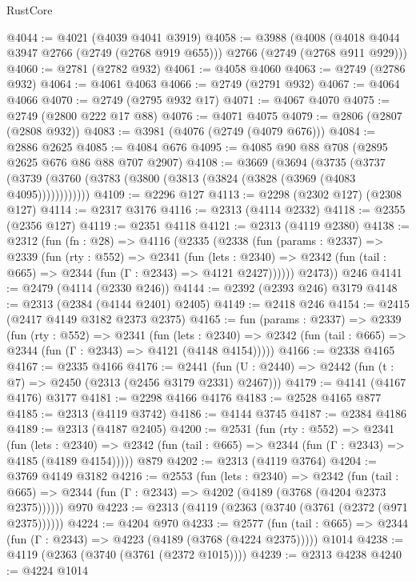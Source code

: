 \begin{lexlean}{RustCore}
\begin{coremodule}
@4044 := @4021 (@4039 @4041 @3919)
@4058 := @3988
    (@4008 (@4018 @4044 @3947 @2766 (@2749 (@2768 @919 @655))) @2766 (@2749 (@2768 @911 @929)))
@4060 := @2781 (@2782 @932)
@4061 := @4058 @4060
@4063 := @2749 (@2786 @932)
@4064 := @4061 @4063
@4066 := @2749 (@2791 @932)
@4067 := @4064 @4066
@4070 := @2749 (@2795 @932 @17)
@4071 := @4067 @4070
@4075 := @2749 (@2800 @222 @17 @88)
@4076 := @4071 @4075
@4079 := @2806 (@2807 (@2808 @932))
@4083 := @3981 (@4076 (@2749 (@4079 @676)))
@4084 := @2886 @2625
@4085 := @4084 @676
@4095 := @4085 @90 @88 @708 (@2895 @2625 @676 @86 @88 @707 @2907)
@4108 := @3669
    (@3694
      (@3735 (@3737 (@3739 (@3760 (@3783 (@3800 (@3813 (@3824 (@3828 (@3969 (@4083 @4095))))))))))))
@4109 := @2296 @127
@4113 := @2298 (@2302 @127) (@2308 @127)
@4114 := @2317 @3176
@4116 := @2313 (@4114 @2332)
@4118 := @2355 (@2356 @127)
@4119 := @2351 @4118
@4121 := @2313 (@4119 @2380)
@4138 := @2312
    (fun (fn : @28) =>
    @4116
      (@2335
        (@2338
          (fun (params : @2337) =>
          @2339
            (fun (rty : @552) =>
            @2341
              (fun (lets : @2340) =>
              @2342 (fun (tail : @665) => @2344 (fun (Γ : @2343) => @4121 @2427))))))
        @2473))
    @246
@4141 := @2479 (@4114 (@2330 @246))
@4144 := @2392 (@2393 @246) @3179
@4148 := @2313 (@2384 (@4144 @2401) @2405)
@4149 := @2418 @246
@4154 := @2415 (@2417 @4149 @3182 @2373 @2375)
@4165 := fun (params : @2337) =>
  @2339
    (fun (rty : @552) =>
    @2341
      (fun (lets : @2340) =>
      @2342 (fun (tail : @665) => @2344 (fun (Γ : @2343) => @4121 (@4148 @4154)))))
@4166 := @2338 @4165
@4167 := @2335 @4166
@4176 := @2441 (fun (U : @2440) => @2442 (fun (t : @7) => @2450 (@2313 (@2456 @3179 @2331) @2467)))
@4179 := @4141 (@4167 @4176) @3177
@4181 := @2298 @4166 @4176
@4183 := @2528 @4165 @877
@4185 := @2313 (@4119 @3742)
@4186 := @4144 @3745
@4187 := @2384 @4186
@4189 := @2313 (@4187 @2405)
@4200 := @2531
    (fun (rty : @552) =>
    @2341
      (fun (lets : @2340) =>
      @2342 (fun (tail : @665) => @2344 (fun (Γ : @2343) => @4185 (@4189 @4154)))))
    @879
@4202 := @2313 (@4119 @3764)
@4204 := @3769 @4149 @3182
@4216 := @2553
    (fun (lets : @2340) =>
    @2342
      (fun (tail : @665) => @2344 (fun (Γ : @2343) => @4202 (@4189 (@3768 (@4204 @2373 @2375))))))
    @970
@4223 := @2313 (@4119 (@2363 (@3740 (@3761 (@2372 (@971 @2375))))))
@4224 := @4204 @970
@4233 := @2577
    (fun (tail : @665) => @2344 (fun (Γ : @2343) => @4223 (@4189 (@3768 (@4224 @2375)))))
    @1014
@4238 := @4119 (@2363 (@3740 (@3761 (@2372 @1015))))
@4239 := @2313 @4238
@4240 := @4224 @1014

\end{coremodule}
\end{lexlean}
